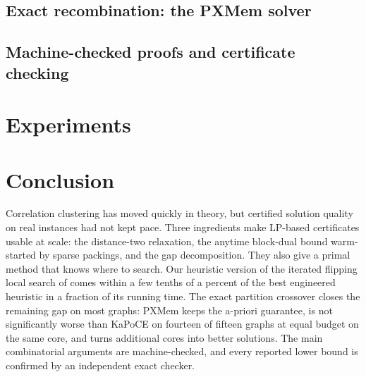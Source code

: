 \documentclass[11pt]{article}
\theoremstyle{definition}
\begin{document}
\subsection{Exact recombination: the PXMem solver}\label{sec:pxmem}


\subsection{Machine-checked proofs and certificate checking}\label{sec:lean}


\section{Experiments}\label{sec:exp}


\section{Conclusion}

Correlation clustering has moved quickly in theory, but certified solution
quality on real instances had not kept pace.  Three ingredients make LP-based
certificates usable at scale: the distance-two relaxation, the anytime
block-dual bound warm-started by sparse packings, and the gap decomposition.
They also give a primal method that knows where to search.  Our heuristic
version of the iterated flipping local search of \citet{CohenAddadLPTYZ24}
comes within a few tenths of a percent of the best engineered heuristic in a
fraction of its running time.  The exact
partition crossover closes the remaining gap on most graphs: PXMem keeps the
a-priori guarantee, is not significantly worse than KaPoCE on fourteen of fifteen graphs at
equal budget on the same core, and turns additional cores into better
solutions.  The main combinatorial arguments are machine-checked, and every
reported lower bound is confirmed by an independent exact checker.
\end{document}
